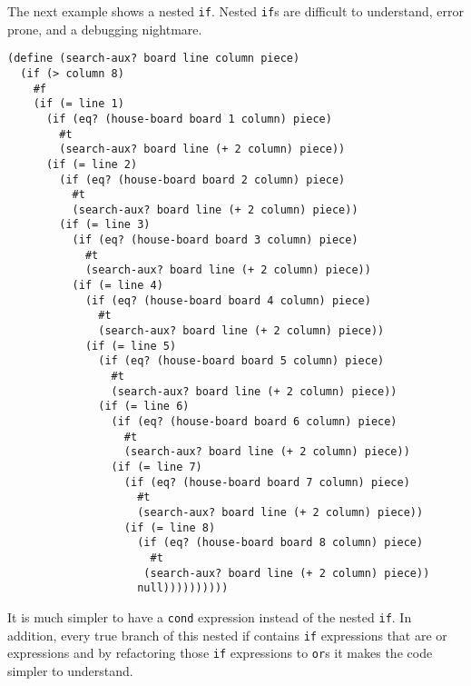 The next example shows a nested {\tt if}. Nested {\tt if}s are
 difficult to understand, error prone, and a debugging nightmare.
 \begin{absolutelynopagebreak}


\begin{lstlisting}
(define (search-aux? board line column piece)
  (if (> column 8)
    #f
    (if (= line 1)
      (if (eq? (house-board board 1 column) piece)
        #t
        (search-aux? board line (+ 2 column) piece))
      (if (= line 2)
        (if (eq? (house-board board 2 column) piece)
          #t
          (search-aux? board line (+ 2 column) piece))
        (if (= line 3)
          (if (eq? (house-board board 3 column) piece)
            #t
            (search-aux? board line (+ 2 column) piece))
          (if (= line 4)
            (if (eq? (house-board board 4 column) piece)
              #t
              (search-aux? board line (+ 2 column) piece))
            (if (= line 5)
              (if (eq? (house-board board 5 column) piece)
                #t
                (search-aux? board line (+ 2 column) piece))
              (if (= line 6)
                (if (eq? (house-board board 6 column) piece)
                  #t
                  (search-aux? board line (+ 2 column) piece))
                (if (= line 7)
                  (if (eq? (house-board board 7 column) piece)
                    #t
                    (search-aux? board line (+ 2 column) piece))
                  (if (= line 8)
                    (if (eq? (house-board board 8 column) piece)
                      #t
                     (search-aux? board line (+ 2 column) piece))
                    null))))))))))
\end{lstlisting}
\end{absolutelynopagebreak}
It is much simpler to have a {\tt cond} expression instead of the nested {\tt if}.
In addition, every true branch of this nested if contains {\tt if} expressions that are
or expressions and by refactoring those {\tt if} expressions to {\tt or}s it makes the code
simpler to understand.


